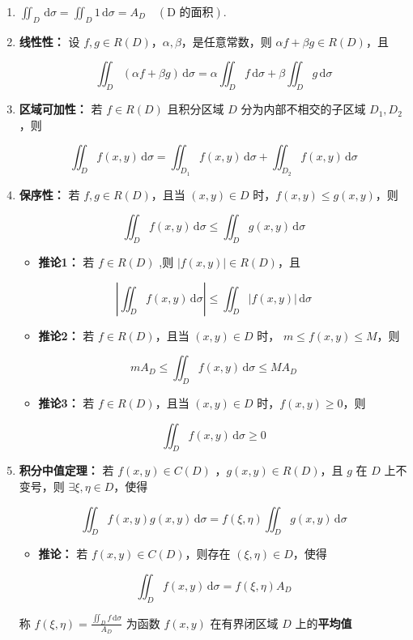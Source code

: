 \documentclass[lang = zh , final , oneside , openany , titlepage , zihao = -4 , linespread = 1.3 , baselineskip = false , cjk-font = windows , text-font = newtx , math-font = newtx]{sjtureport}
\begin{document}
\begin{enumerate}
\def\labelenumi{\arabic{enumi}.}
\item
  \(\displaystyle\iint_D\,\mathrm{d}\sigma = \iint_D 1\,\mathrm{d}\sigma = A_D \quad\left(\text{D 的面积}\right)\).
\item
  \textbf{线性性：} 设
  \(f,g\in R(D)\)，\(\alpha , \beta\)，是任意常数，则
  \(\alpha f +\beta g \in R(D)\)，且

  \[\iint_D (\alpha f +\beta g)\,\mathrm{d}\sigma = \alpha \iint_D f\,\mathrm{d}\sigma + \beta \iint_D g\,\mathrm{d}\sigma\]
\item
  \textbf{区域可加性：} 若 \(f\in R(D)\) 且积分区域 \(D\)
  分为内部不相交的子区域 \(D_1 , D_2\)，则

  \[\iint_D f(x,y) \,\mathrm{d}\sigma = \iint_{D_1} f(x,y)\,\mathrm{d}\sigma + \iint_{D_2} f(x,y)\,\mathrm{d}\sigma\]
\item
  \textbf{保序性：} 若 \(f,g\in R(D)\)，且当 \((x,y)\in D\)
  时，\(f(x,y)\leq g(x,y)\)，则

  \[\iint_D f(x,y)\,\mathrm{d}\sigma \leq \iint_D g(x,y)\,\mathrm{d}\sigma\]

  \begin{itemize}
  \item
    \textbf{推论1：} 若 \(f\in R(D)\) ,则
    \(\vert f(x,y) \vert \in R(D)\)，且
  \end{itemize}

  \[\left\vert \iint_D f(x,y)\,\mathrm{d}\sigma \right\vert \leq \iint_D \vert f(x,y) \vert \,\mathrm{d}\sigma\]

  \begin{itemize}
  \item
    \textbf{推论2：} 若 \(f\in R(D)\)，且当 \((x,y)\in D\) 时，
    \(m\leq f(x,y) \leq M\)，则
  \end{itemize}

  \[mA_D \leq \iint_D f(x,y)\,\mathrm{d}\sigma \leq MA_D\]

  \begin{itemize}
  \item
    \textbf{推论3：} 若 \(f\in R(D)\)，且当 \((x,y)\in D\)
    时，\(f(x,y) \geq 0\)，则
  \end{itemize}

  \[\iint_D f(x,y)\,\mathrm{d}\sigma \geq 0\]
\item
  \textbf{积分中值定理：} 若 \(f(x,y)\in C(D)\) ，\(g(x,y)\in R(D)\)，且
  \(g\) 在 \(D\) 上不变号，则 \(\exists \xi , \eta \in D\)，使得

  \[\iint_D f(x,y)g(x,y)\,\mathrm{d}\sigma = f(\xi ,\eta )\iint_D g(x,y)\,\mathrm{d}\sigma\]

  \begin{itemize}
  \item
    \textbf{推论：} 若 \(f(x,y)\in C(D)\)，则存在
    \((\xi , \eta )\in D\)，使得
  \end{itemize}

  \[\iint_D f(x,y)\,\mathrm{d}\sigma = f(\xi ,\eta )A_D\]

  称 \(f(\xi,\eta) = \frac{\iint_D f\,\mathrm{d}\sigma}{A_D}\) 为函数
  \(f(x,y)\) 在有界闭区域 \(D\) 上的\textbf{平均值}
\end{enumerate}
\end{document}
